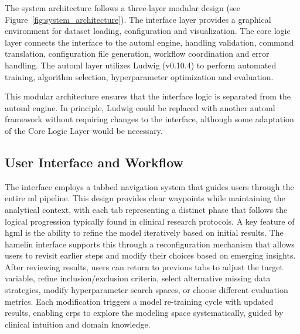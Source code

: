 \documentclass[conference,twocolumn]{IEEEtran}
\begin{document}
The system architecture follows a three-layer modular design (see Figure~\ref{fig:system_architecture}). The interface layer provides a graphical environment for dataset loading, configuration and visualization. The core logic layer connects the interface to the \gls{automl} engine, handling validation, command translation, configuration file generation, workflow coordination and error handling. The \gls{automl} layer utilizes Ludwig (v0.10.4) to perform automated training, algorithm selection, hyperparameter optimization and evaluation.
  
This modular architecture ensures that the interface logic is separated from the \gls{automl} engine. In principle, Ludwig could be replaced with another \gls{automl} framework without requiring changes to the interface, although some adaptation of the Core Logic Layer would be necessary.
  
\subsection{User Interface and Workflow}
  
The interface employs a tabbed navigation system that guides users through the entire \gls{ml} pipeline. This design provides clear waypoints while maintaining the analytical context, with each tab representing a distinct phase that follows the logical progression typically found in clinical research protocols. A key feature of \gls{hgml} is the ability to refine the model iteratively based on initial results. The \gls{hamelin} interface supports this through a reconfiguration mechanism that allows users to revisit earlier steps and modify their choices based on emerging insights. After reviewing results, users can return to previous tabs to adjust the target variable, refine inclusion/exclusion criteria, select alternative missing data strategies, modify hyperparameter search spaces, or choose different evaluation metrics. Each modification triggers a model re-training cycle with updated results, enabling \glspl{crp} to explore the modeling space systematically, guided by clinical intuition and domain knowledge.
\end{document}

